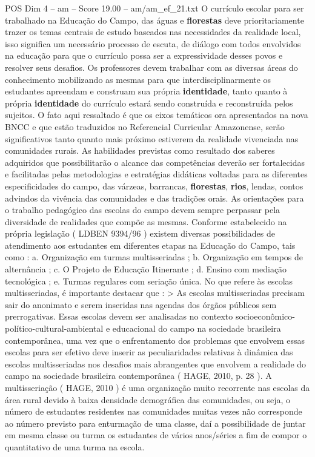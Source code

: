 \begin{textsample}{POS Dim 4 – am – Score 19.00 – am/am\_ef\_21.txt}
O currículo escolar para ser trabalhado na Educação do Campo, das águas e \textbf{florestas} deve prioritariamente trazer os temas centrais de estudo baseados nas necessidades da realidade local, isso significa um necessário processo de escuta, de diálogo com todos envolvidos na educação para que o currículo possa ser a expressividade desses povos e resolver seus desafios.
Os professores devem trabalhar com as diversas áreas do conhecimento mobilizando as mesmas para que interdisciplinarmente os estudantes apreendam e construam sua própria \textbf{identidade}, tanto quanto à própria \textbf{identidade} do currículo estará sendo construída e reconstruída pelos sujeitos.
O fato aqui ressaltado é que os eixos temáticos ora apresentados na nova BNCC e que estão traduzidos no Referencial Curricular Amazonense, serão significativos tanto quanto mais próximo estiverem da realidade vivenciada nas comunidades rurais.
As habilidades previstas como resultado dos saberes adquiridos que possibilitarão o alcance das competências deverão ser fortalecidas e facilitadas pelas metodologias e estratégias didáticas voltadas para as diferentes especificidades do campo, das várzeas, barrancas, \textbf{florestas}, \textbf{rios}, lendas, contos advindos da vivência das comunidades e das tradições orais.
As orientações para o trabalho pedagógico das escolas do campo devem sempre perpassar pela diversidade de realidades que compõe as mesmas.
Conforme estabelecido na própria legislação ( LDBEN 9394/96 ) existem diversas possibilidades de atendimento aos estudantes em diferentes etapas na Educação do Campo, tais como : a.
Organização em turmas multisseriadas ; b.
Organização em tempos de alternância ; c.
O Projeto de Educação Itinerante ; d.
Ensino com mediação tecnológica ; e.
Turmas regulares com seriação única.
No que refere às escolas multisseriadas, é importante destacar que : > As escolas multisseriadas precisam sair do anonimato e serem inseridas nas agendas dos órgãos públicos sem prerrogativas.
Essas escolas devem ser analisadas no contexto socioeconômico-político-cultural-ambiental e educacional do campo na sociedade brasileira contemporânea, uma vez que o enfrentamento dos problemas que envolvem essas escolas para ser efetivo deve inserir as peculiaridades relativas à dinâmica das escolas multisseriadas nos desafios mais abrangentes que envolvem a realidade do campo na sociedade brasileira contemporânea ( HAGE, 2010, p. 28 ).
A multisseriação ( HAGE, 2010 ) é uma organização muito recorrente nas escolas da área rural devido à baixa densidade demográfica das comunidades, ou seja, o número de estudantes residentes nas comunidades muitas vezes não corresponde ao número previsto para enturmação de uma classe, daí a possibilidade de juntar em mesma classe ou turma os estudantes de vários anos/séries a fim de compor o quantitativo de uma turma na escola.

\end{textsample}
